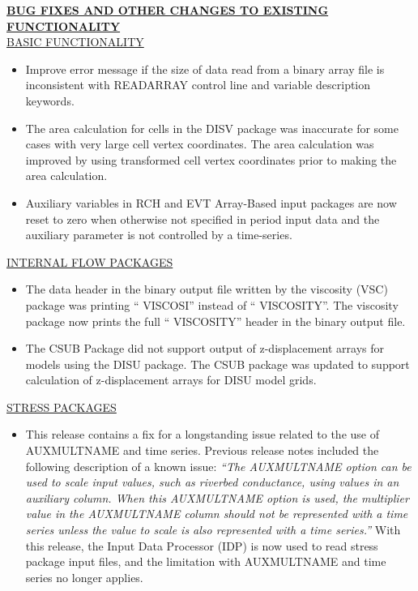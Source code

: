 	\textbf{\underline{BUG FIXES AND OTHER CHANGES TO EXISTING FUNCTIONALITY}} \\
	\underline{BASIC FUNCTIONALITY}
	\begin{itemize}
		\item Improve error message if the size of data read from a binary array file is inconsistent with READARRAY control line and variable description keywords.
		\item The area calculation for cells in the DISV package was inaccurate for some cases with very large cell vertex coordinates.  The area calculation was improved by using transformed cell vertex coordinates prior to making the area calculation.
		\item Auxiliary variables in RCH and EVT Array-Based input packages are now reset to zero when otherwise not specified in period input data and the auxiliary parameter is not controlled by a time-series.
	\end{itemize}

	\underline{INTERNAL FLOW PACKAGES}
	\begin{itemize}
		\item The data header in the binary output file written by the viscosity (VSC) package was printing `` VISCOSI'' instead of `` VISCOSITY''. The viscosity package now prints the full `` VISCOSITY'' header in the binary output file.
		\item The CSUB Package did not support output of z-displacement arrays for models using the DISU package.  The CSUB package was updated to support calculation of z-displacement arrays for DISU model grids.
	\end{itemize}

	\underline{STRESS PACKAGES}
	\begin{itemize}
		\item This release contains a fix for a longstanding issue related to the use of AUXMULTNAME and time series.  Previous release notes included the following description of a known issue: \textit{``The AUXMULTNAME option can be used to scale input values, such as riverbed conductance, using values in an auxiliary column.  When this AUXMULTNAME option is used, the multiplier value in the AUXMULTNAME column should not be represented with a time series unless the value to scale is also represented with a time series.''}  With this release, the Input Data Processor (IDP) is now used to read stress package input files, and the limitation with AUXMULTNAME and time series no longer applies.
	\end{itemize}

